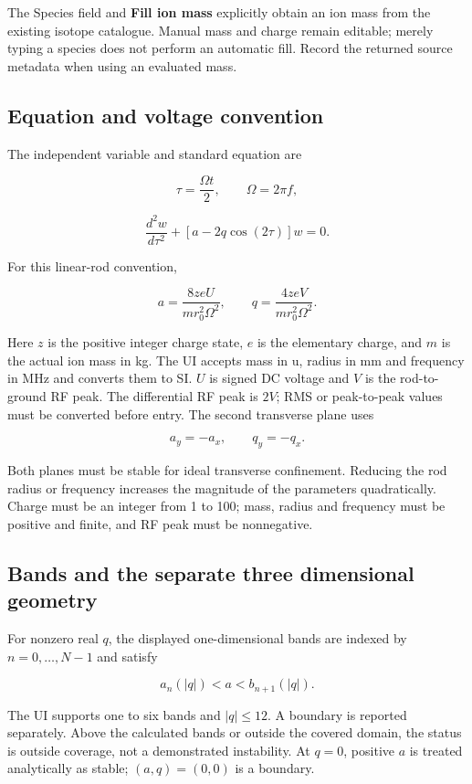 \documentclass[
  aps,
  onecolumn,
  11pt]{revtex4-2}
\begin{document}
The Species field and \textbf{Fill ion mass} explicitly obtain an ion
mass from the existing isotope catalogue. Manual mass and charge remain
editable; merely typing a species does not perform an automatic fill.
Record the returned source metadata when using an evaluated mass.

\subsection{Equation and voltage
convention}\label{equation-and-voltage-convention}

The independent variable and standard equation are

\[\tau=\frac{\Omega t}{2},\qquad \Omega=2\pi f,\]

\[\frac{d^2w}{d\tau^2}+\left[a-2q\cos(2\tau)\right]w=0.\]

For this linear-rod convention,

\[a=\frac{8zeU}{m r_0^2\Omega^2},\qquad q=\frac{4zeV}{m r_0^2\Omega^2}.\]

Here \(z\) is the positive integer charge state, \(e\) is the elementary
charge, and \(m\) is the actual ion mass in kg. The UI accepts mass in
u, radius in mm and frequency in MHz and converts them to SI. \(U\) is
signed DC voltage and \(V\) is the rod-to-ground RF peak. The
differential RF peak is \(2V\); RMS or peak-to-peak values must be
converted before entry. The second transverse plane uses

\[a_y=-a_x,\qquad q_y=-q_x.\]

Both planes must be stable for ideal transverse confinement. Reducing
the rod radius or frequency increases the magnitude of the parameters
quadratically. Charge must be an integer from 1 to 100; mass, radius and
frequency must be positive and finite, and RF peak must be nonnegative.

\subsection{Bands and the separate three dimensional
geometry}\label{bands-and-the-separate-three-dimensional-geometry}

For nonzero real \(q\), the displayed one-dimensional bands are indexed
by \(n=0,\ldots,N-1\) and satisfy

\[a_n(|q|)<a<b_{n+1}(|q|).\]

The UI supports one to six bands and \(|q|\leq12\). A boundary is
reported separately. Above the calculated bands or outside the covered
domain, the status is outside coverage, not a demonstrated instability.
At \(q=0\), positive \(a\) is treated analytically as stable;
\((a,q)=(0,0)\) is a boundary.
\end{document}
